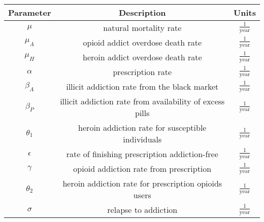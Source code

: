 \documentclass[12pt]{article}
\begin{document}
\begin{center}
\begin{tabular}{|c | c | c | }

 \hline

{Parameter} & {Description} & {Units} \\ [0.5ex]

 \hline\hline
 
 $\mu$ &  natural mortality rate & $\frac{1}{\text{year}}$ \\

 \hline

 $\mu_A$ & opioid addict overdose death rate & $\frac{1}{\text{year}}$\\

 \hline
 
 $\mu_H$ &  heroin addict overdose death rate & $\frac{1}{\text{year}}$ \\

 \hline

$\alpha$ &  prescription rate & $\frac{1}{\text{year}}$    \\

 \hline

$\beta_A$ & illicit addiction rate from the black market & $\frac{1}{\text{year}}$  \\

\hline

$\beta_P$ &  illicit addiction rate from availability of excess pills & $\frac{1}{\text{year}}$  \\

\hline

$\theta_1$&  heroin addiction rate for susceptible individuals & $\frac{1}{\text{year}}$   \\

\hline

$\epsilon$ &  rate of finishing prescription addiction-free & $\frac{1}{\text{year}}$ \\

\hline

$\gamma$ &  opioid addiction rate from prescription & $\frac{1}{\text{year}}$ \\

\hline

$\theta_2$ &  heroin addiction rate for prescription opioids users & $\frac{1}{\text{year}}$  \\

\hline

$\sigma$ &  relapse to addiction & $\frac{1}{\text{year}}$  \\


\end{tabular}
\end{center}
\end{document}
